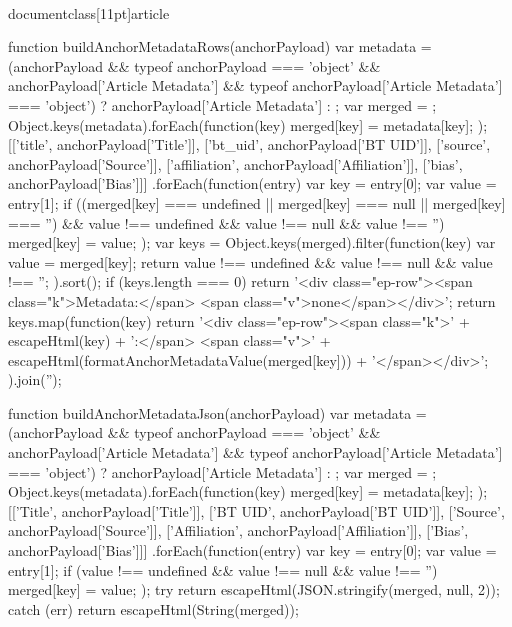 \\documentclass[11pt]{article}
\begin{document}
\begin{CodeBlock}
{{{{{{        function buildAnchorMetadataRows(anchorPayload) {{
            var metadata = (anchorPayload && typeof anchorPayload === 'object' && anchorPayload['Article Metadata'] && typeof anchorPayload['Article Metadata'] === 'object')
                ? anchorPayload['Article Metadata']
                : {{}};
            var merged = {{}};
            Object.keys(metadata).forEach(function(key) {{
                merged[key] = metadata[key];
            }});
            [['title', anchorPayload['Title']],
             ['bt_uid', anchorPayload['BT UID']],
             ['source', anchorPayload['Source']],
             ['affiliation', anchorPayload['Affiliation']],
             ['bias', anchorPayload['Bias']]]
                .forEach(function(entry) {{
                    var key = entry[0];
                    var value = entry[1];
                    if ((merged[key] === undefined || merged[key] === null || merged[key] === '') && value !== undefined && value !== null && value !== '') {{
                        merged[key] = value;
                    }}
                }});
            var keys = Object.keys(merged).filter(function(key) {{
                var value = merged[key];
                return value !== undefined && value !== null && value !== '';
            }}).sort();
            if (keys.length === 0) {{
                return '<div class="ep-row"><span class="k">Metadata:</span> <span class="v">none</span></div>';
            }}
            return keys.map(function(key) {{
                return '<div class="ep-row"><span class="k">' + escapeHtml(key) + ':</span> <span class="v">' + escapeHtml(formatAnchorMetadataValue(merged[key])) + '</span></div>';
            }}).join('');
        }}

        function buildAnchorMetadataJson(anchorPayload) {{
            var metadata = (anchorPayload && typeof anchorPayload === 'object' && anchorPayload['Article Metadata'] && typeof anchorPayload['Article Metadata'] === 'object')
                ? anchorPayload['Article Metadata']
                : {{}};
            var merged = {{}};
            Object.keys(metadata).forEach(function(key) {{
                merged[key] = metadata[key];
            }});
            [['Title', anchorPayload['Title']],
             ['BT UID', anchorPayload['BT UID']],
             ['Source', anchorPayload['Source']],
             ['Affiliation', anchorPayload['Affiliation']],
             ['Bias', anchorPayload['Bias']]]
                .forEach(function(entry) {{
                    var key = entry[0];
                    var value = entry[1];
                    if (value !== undefined && value !== null && value !== '') {{
                        merged[key] = value;
                    }}
                }});
            try {{
                return escapeHtml(JSON.stringify(merged, null, 2));
            }} catch (err) {{
                return escapeHtml(String(merged));
            }}
        }}

}}}}}}
\end{CodeBlock}
\end{document}
